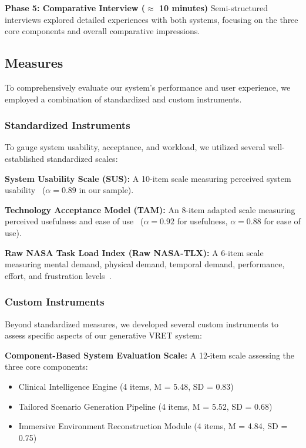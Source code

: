 \documentclass[]{interact}
\begin{document}
\textbf{Phase 5: Comparative Interview ($\approx$ 10 minutes)}
Semi-structured interviews explored detailed experiences with both systems, focusing on the three core components and overall comparative impressions.

\subsection{Measures}
To comprehensively evaluate our system's performance and user experience, we employed a combination of standardized and custom instruments.

\subsubsection{Standardized Instruments}
To gauge system usability, acceptance, and workload, we utilized several well-established standardized scales:

\textbf{System Usability Scale (SUS):} A 10-item scale measuring perceived system usability~\cite{brooke1996sus} ($\alpha = 0.89$ in our sample).

\textbf{Technology Acceptance Model (TAM):} An 8-item adapted scale measuring perceived usefulness and ease of use~\cite{davis1989perceived} ($\alpha = 0.92$ for usefulness, $\alpha = 0.88$ for ease of use).

\textbf{Raw NASA Task Load Index (Raw NASA-TLX):} A 6-item scale measuring mental demand, physical demand, temporal demand, performance, effort, and frustration levels~\cite{hart1988development}.

\subsubsection{Custom Instruments}
Beyond standardized measures, we developed several custom instruments to assess specific aspects of our generative VRET system:

\textbf{Component-Based System Evaluation Scale:} A 12-item scale assessing the three core components:
\begin{itemize}
    \item Clinical Intelligence Engine (4 items, M = 5.48, SD = 0.83)
    \item Tailored Scenario Generation Pipeline (4 items, M = 5.52, SD = 0.68)
    \item Immersive Environment Reconstruction Module (4 items, M = 4.84, SD = 0.75)
\end{itemize}
\end{document}

